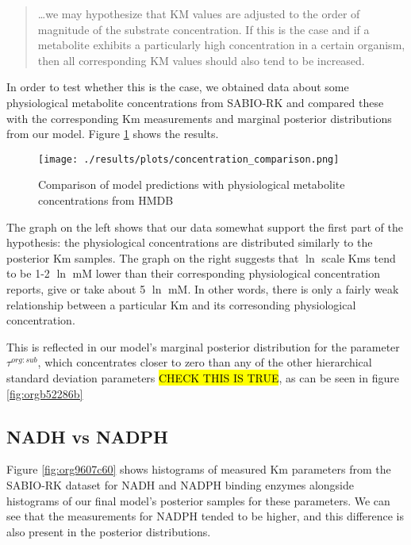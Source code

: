 \documentclass[11pt]{article}
\begin{document}
\begin{quote}
\ldots{}we may hypothesize that KM values are adjusted to the order of magnitude of
the substrate concentration. If this is the case and if a metabolite exhibits a
particularly high concentration in a certain organism, then all corresponding KM
values should also tend to be increased.
\end{quote}

In order to test whether this is the case, we obtained data about some
physiological metabolite concentrations from SABIO-RK and compared these with
the corresponding Km measurements and marginal posterior distributions from our
model. Figure \ref{fig:org295e429} shows the results.

\begin{figure}[htbp]
\centering
\texttt{[image: ./results/plots/concentration\_comparison.png]}
\caption{\label{fig:org295e429}Comparison of model predictions with physiological metabolite concentrations from HMDB}
\end{figure}

The graph on the left shows that our data somewhat support the first part of the
hypothesis: the physiological concentrations are distributed similarly to the
posterior Km samples. The graph on the right suggests that \(\ln\) scale Kms tend to be 1-2 \(\ln\) mM lower than their corresponding physiological concentration reports, give or take about 5 \(\ln\) mM. In other words, there is only a fairly weak relationship between a particular Km and its corresonding physiological concentration.

This is reflected in our model's marginal posterior distribution for the
parameter \(\tau^{org:sub}\), which concentrates closer to zero than any of the
other hierarchical standard deviation parameters \hl{CHECK THIS IS TRUE}, as can be
seen in figure \ref{fig:orgb52286b}

\subsection{NADH vs NADPH}
\label{sec:orge6cf3c7}

Figure \ref{fig:org9607c60} shows histograms of measured Km parameters from the SABIO-RK
dataset for NADH and NADPH binding enzymes alongside histograms of our final
model's posterior samples for these parameters. We can see that the measurements
for NADPH tended to be higher, and this difference is also present in the posterior
distributions.
\end{document}
